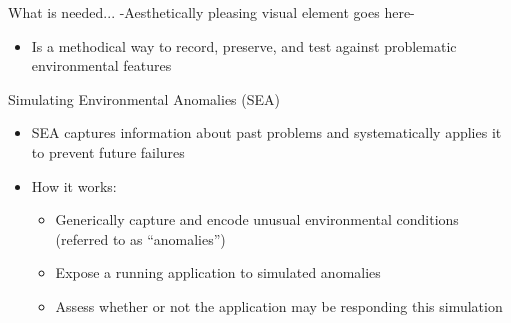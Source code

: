 \documentclass[pdf]{beamer}
\begin{document}
\begin{frame}{What is needed...}
  -Aesthetically pleasing visual element goes here-
  \begin{itemize}
    \item{Is a methodical way to record, preserve, and test against
      problematic environmental features}
  \end{itemize}
\end{frame}



\begin{frame}{Simulating Environmental Anomalies (SEA)}
  \begin{itemize}
    \item{SEA captures information about past problems and systematically
        applies it to prevent future failures}
    \item{How it works:}
      \begin{itemize}
        \item{Generically capture and encode unusual environmental
          conditions (referred to as ``anomalies'')}
        \item{Expose a running application to simulated anomalies}
        \item{Assess whether or not the application may be responding this
          simulation}
      \end{itemize}
  \end{itemize}
\end{frame}
\end{document}
